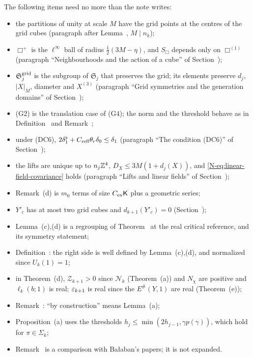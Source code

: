 \begin{detail}\label{xb:d-rest}
The following items need no more than the note writes:
\begin{itemize}
\item the partitions of unity at scale $M$ have the grid points at the centres of the grid cubes (paragraph after Lemma~, $M\mid n_k$);
\item $\Box^+$ is the $\ell^\infty$ ball of radius $\frac12(3M-\eta)$, and $S_\Box$ depends only on $\Box^{(1)}$ (paragraph ``Neighbourhoods and the action of a cube'' of Section~);
\item $\mathfrak S^{\rm grid}_j$ is the subgroup of $\mathfrak S_j$ that preserves the grid; its elements preserve $d_j$, $|X|_M$, diameter and $X^{(3)}$ (paragraph ``Grid symmetries and the generation domains'' of Section~);
\item (G2) is the translation case of (G4); the norm and the threshold behave as in Definition~ and Remark~;
\item under (DC6), $2\delta_1^\flat+C_{\rm refl}\theta_r\delta_0\le\delta_1$ (paragraph ``The condition (DC6)'' of Section~);
\item the lifts are unique up to $n_j\mathbb Z^4$, $D_X\le3M(1+d_j(X))$, and \eqref{N-eq:linear-field-covariance} holds (paragraph ``Lifts and linear fields'' of Section~);
\item Remark~(d) is $m_0$ terms of size $C_{\rm ex}\mathsf K$ plus a geometric series;
\item $Y'_c$ has at most two grid cubes and $d_{k+1}(Y'_c)=0$ (Section~);
\item Lemma~(c),(d) is a regrouping of Theorem~ at the real critical reference, and its symmetry statement;
\item Definition~: the right side is well defined by Lemma~(c),(d), and normalized since $U_k(1)=1$;
\item in Theorem~(d), $\mathcal Z_{k+1}>0$ since $\mathcal N_k$ (Theorem~(a)) and $N_\chi$ are positive and $\ell_k(b;1)$ is real; $\varepsilon_{k+1}$ is real since the $E^\#(Y,1)$ are real (Theorem~(e));
\item Remark~: ``by construction'' means Lemma~(a);
\item Proposition~(a) uses the thresholds $h_j\le\min(2h_{j-1},\gamma p(\gamma))$, which hold for $\pi\in\Sigma_k$;
\item Remark~ is a comparison with Ba\l aban's papers; it is not expanded.
\end{itemize}
\end{detail}

